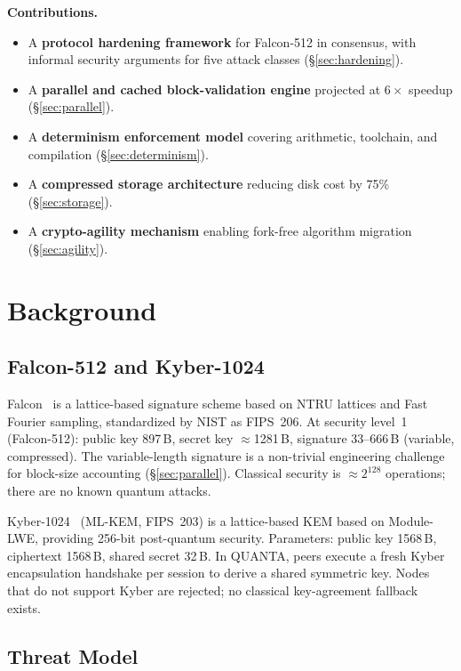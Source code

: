 \documentclass[11pt,a4paper]{article}
\begin{document}
\textbf{Contributions.}
\begin{itemize}
  \item A \textbf{protocol hardening framework} for Falcon-512 in consensus, with informal security arguments for five attack classes (\S\ref{sec:hardening}).
  \item A \textbf{parallel and cached block-validation engine} projected at $6{\times}$ speedup (\S\ref{sec:parallel}).
  \item A \textbf{determinism enforcement model} covering arithmetic, toolchain, and compilation (\S\ref{sec:determinism}).
  \item A \textbf{compressed storage architecture} reducing disk cost by 75\% (\S\ref{sec:storage}).
  \item A \textbf{crypto-agility mechanism} enabling fork-free algorithm migration (\S\ref{sec:agility}).
\end{itemize}

\section{Background}

\subsection{Falcon-512 and Kyber-1024}

Falcon~\cite{falcon2020} is a lattice-based signature scheme based on NTRU
lattices and Fast Fourier sampling, standardized by NIST as FIPS~206. At
security level~1 (Falcon-512): public key 897\,B, secret key
$\approx$1281\,B, signature 33--666\,B (variable, compressed). The
variable-length signature is a non-trivial engineering challenge for
block-size accounting (\S\ref{sec:parallel}). Classical security is
$\approx 2^{128}$ operations; there are no known quantum attacks.

Kyber-1024~\cite{fips203} (ML-KEM, FIPS~203) is a lattice-based KEM based
on Module-LWE, providing 256-bit post-quantum security. Parameters: public
key 1568\,B, ciphertext 1568\,B, shared secret 32\,B. In QUANTA, peers
execute a fresh Kyber encapsulation handshake per session to derive a shared
symmetric key. Nodes that do not support Kyber are rejected; no classical
key-agreement fallback exists.

\subsection{Threat Model}
\end{document}
